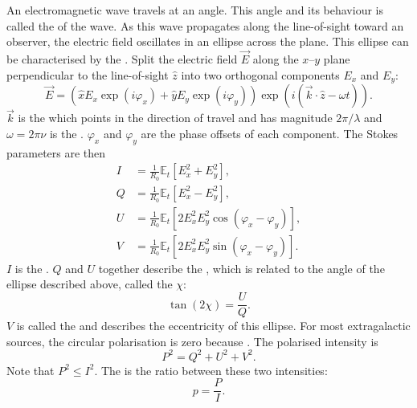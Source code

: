             An electromagnetic wave travels at an angle. This angle and its behaviour is called the  of the wave. As this wave propagates along the line-of-sight toward an observer, the electric field oscillates in an ellipse across the plane. This ellipse can be characterised by the . Split the electric field $\vec E$ along the $x$--$y$ plane perpendicular to the line-of-sight $\hat z$ into two orthogonal components $E_x$ and $E_y$:
            \begin{equation}
                \vec E = (\hat x E_x \exp(i \varphi_x) + \hat y E_y \exp(i \varphi_y)) \exp(i (\vec k \cdot \hat z - \omega t)).
            \end{equation}
            $\vec k$ is the  which points in the direction of travel and has magnitude $2\pi/\lambda$ and $\omega = 2\pi\nu$ is the . $\varphi_x$ and $\varphi_y$ are the phase offsets of each component. The Stokes parameters are then \citep{condon_essential_2016}
            \begin{align}
                \label{eq:stokes-i}
                I &= \frac{1}{R_0} \mathbb E_t[E_x^2 + E_y^2],\\
                \label{eq:stokes-q}
                Q &= \frac{1}{R_0} \mathbb E_t[E_x^2 - E_y^2],\\
                \label{eq:stokes-u}
                U &= \frac{1}{R_0} \mathbb E_t[2 E_x^2 E_y^2 \cos (\varphi_x - \varphi_y)],\\
                \label{eq:stokes-v}
                V &= \frac{1}{R_0} \mathbb E_t[2 E_x^2 E_y^2 \sin (\varphi_x - \varphi_y)].
            \end{align}
            $I$ is the . $Q$ and $U$ together describe the , which is related to the angle of the ellipse described above, called the  $\chi$:
            \begin{equation}
                \label{eq:polarisation-angle}
                \tan (2 \chi) = \frac{U}{Q}.
            \end{equation}
            $V$ is called the  and describes the eccentricity of this ellipse. For most extragalactic sources, the circular polarisation is zero \citeneeded because . The polarised intensity is
            \begin{equation}
                \label{eq:polarised-intensity}
                P^2 = Q^2 + U^2 + V^2.
            \end{equation}
            Note that $P^2 \leq I^2$. The  is the ratio between these two intensities:
            \begin{equation}
                p = \frac{P}{I}.
            \end{equation}

